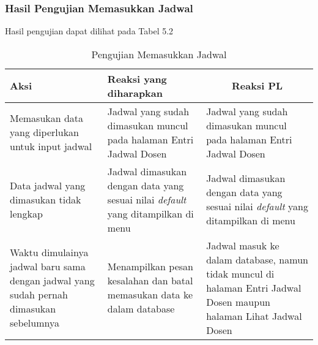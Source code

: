 \subsubsection{Hasil Pengujian Memasukkan Jadwal}
Hasil pengujian dapat dilihat pada Tabel 5.2
\begin{center}
	\begin{table}[H]
		\caption{Pengujian Memasukkan Jadwal}
		\begin{tabular}{|p{5cm}|p{5cm}|p{5cm}|}
		\hline
		\centering Aksi	& 	\centering Reaksi yang diharapkan &  \multicolumn{1}{c|}{Reaksi PL} \\
		\hline
		Memasukan data yang diperlukan untuk input jadwal & Jadwal yang sudah dimasukan muncul pada halaman Entri Jadwal Dosen & Jadwal yang sudah dimasukan muncul pada halaman Entri Jadwal Dosen \\
		\hline
		Data jadwal yang dimasukan tidak lengkap & Jadwal dimasukan dengan data yang sesuai nilai \textit{default} yang ditampilkan di menu & Jadwal dimasukan dengan data yang sesuai nilai \textit{default} yang ditampilkan di menu \\
		\hline
		Waktu dimulainya jadwal baru sama dengan jadwal yang sudah pernah dimasukan sebelumnya & Menampilkan pesan kesalahan dan batal memasukan data ke dalam database & Jadwal masuk ke dalam database, namun tidak muncul di halaman Entri Jadwal Dosen maupun halaman Lihat Jadwal Dosen \\
		\hline
		\end{tabular}
	\end{table}
\end{center}

